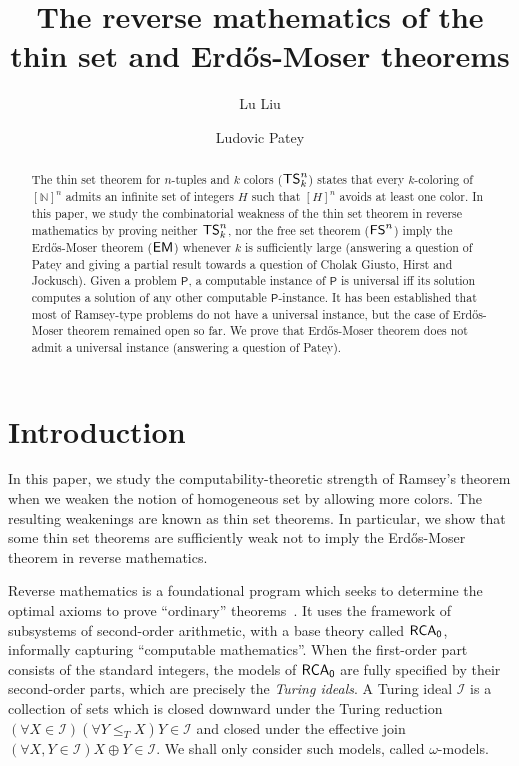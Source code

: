 \documentclass{amsart}
\title{The reverse mathematics of the thin set and Erd\H{o}s-Moser theorems}
\author{Lu Liu}
\author{Ludovic Patey}
\theoremstyle{definition}
\theoremstyle{remark}
\numberwithin{equation}{section}
\theoremstyle{noparens}
\def\msf{\mathsf}
\newcommand{\Nb}{\mathbb{N}}
\newcommand{\Ical}{\mathcal{I}}
\newcommand{\s}[1]{\ensuremath{\sf{#1}}}
\DeclareMathOperator{\rca}{\s{RCA}_0}
\DeclareMathOperator{\ts}{\s{TS}}
\DeclareMathOperator{\fs}{\s{FS}}
\DeclareMathOperator{\emo}{\s{EM}}
\begin{document}
\begin{abstract}
The thin set theorem for $n$-tuples and $k$ colors ($\ts^n_k$)
states that every $k$-coloring of $[\Nb]^n$ admits an infinite set of integers $H$
such that $[H]^n$ avoids at least one color.
In this paper, we study the combinatorial weakness of the thin set theorem
in reverse mathematics by proving neither $\ts^n_k$, nor the free set theorem ($\fs^n$) imply
the Erd\H{o}s-Moser theorem ($\emo$) whenever $k$ is sufficiently large (answering a question of Patey and giving a partial result towards a question of Cholak Giusto, Hirst and Jockusch).
Given a problem $\msf{P}$, a computable instance of $\msf{P}$
is universal iff its solution computes a solution of any other computable
$\msf{P}$-instance. It has been established that most of Ramsey-type problems
do not have a universal instance, but the case of Erd\H{o}s-Moser theorem
remained open so far.
We prove that Erd\H{o}s-Moser theorem does not admit a universal instance (answering a question of Patey).

\end{abstract}

\maketitle



\section{Introduction}

In this paper, we study the computability-theoretic strength of Ramsey's theorem
when we weaken the notion of homogeneous set by allowing more colors. The resulting weakenings are known as thin set theorems. In particular,
we show that some thin set theorems are sufficiently weak not to imply the Erd\H{o}s-Moser theorem in reverse mathematics. %

Reverse mathematics is a foundational program which seeks to determine the optimal axioms
to prove ``ordinary'' theorems~\cite{Friedman1974Some}. It uses the framework of subsystems of second-order arithmetic,
with a base theory called $\rca$, informally capturing ``computable mathematics''.
When the first-order part consists of the standard integers, the models of $\rca$
are fully specified by their second-order parts, which are precisely the \emph{Turing ideals}.
A Turing ideal $\Ical$ is a collection of sets which is closed downward under the Turing
reduction $(\forall X \in \Ical)(\forall Y \leq_T X) Y \in \Ical$ and closed under the
effective join $(\forall X, Y \in \Ical) X \oplus Y \in \Ical$. We shall only consider
such models, called $\omega$-models.
\end{document}

